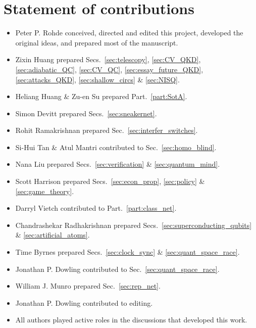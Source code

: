 %
%

\section*{Statement of contributions}

\begin{itemize}
	\item Peter P. Rohde conceived, directed and edited this project, developed the original ideas, and prepared most of the manuscript.
	\item Zixin Huang prepared Secs.~\ref{sec:telescopy}, \ref{sec:CV_QKD}, \ref{sec:adiabatic_QC}, \ref{sec:CV_QC}, \ref{sec:essay_future_QKD}, \ref{sec:attacks_QKD}, \ref{sec:shallow_circs} \& \ref{sec:NISQ}.
	\item Heliang Huang \& Zu-en Su prepared Part.~\ref{part:SotA}.
	\item Simon Devitt prepared Secs.~\ref{sec:sneakernet}.
	\item Rohit Ramakrishnan prepared Sec.~\ref{sec:interfer_switches}.
	\item Si-Hui Tan \& Atul Mantri contributed to Sec.~\ref{sec:homo_blind}.
	\item Nana Liu prepared Secs.~\ref{sec:verification} \& \ref{sec:quantum_mind}.
	\item Scott Harrison prepared Secs.~\ref{sec:econ_prop}, \ref{sec:policy} \& \ref{sec:game_theory}.
	\item Darryl Vietch contributed to Part.~\ref{part:class_net}.
	\item Chandrashekar Radhakrishnan prepared Secs.~\ref{sec:superconducting_qubits} \& \ref{sec:artificial_atoms}.
	\item Time Byrnes prepared Secs.~\ref{sec:clock_sync} \& \ref{sec:quant_space_race}.
	\item Jonathan P. Dowling contributed to Sec.~\ref{sec:quant_space_race}.
	\item William J. Munro prepared Sec.~\ref{sec:rep_net}. 
	\item Jonathan P. Dowling contributed to editing.
	\item All authors played active roles in the discussions that developed this work. 
\end{itemize}